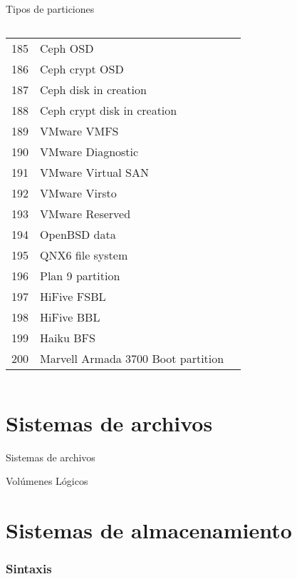 \begin{frame}[c]{Tipos de particiones}
{\begin{columns}
\begin{table}[]
\begin{tabular}{rll}
185&Ceph OSD                      \\
186&Ceph crypt OSD                \\
187&Ceph disk in creation         \\
188&Ceph crypt disk in creation    \\
189&VMware VMFS                    \\
190&VMware Diagnostic              \\
191&VMware Virtual SAN             \\
192&VMware Virsto                  \\
193&VMware Reserved                \\
194&OpenBSD data                   \\
195&QNX6 file system               \\
196&Plan 9 partition               \\
197&HiFive FSBL                    \\
198&HiFive BBL                     \\
199&Haiku BFS                      \\
200&Marvell Armada 3700 Boot partition \\
  \end{tabular}
  \end{table}
  \end{columns}
}
\end{frame}

\section{Sistemas de archivos}

\begin{frame}[c]{Sistemas de archivos}
\end{frame}

\begin{frame}[c]{Volúmenes Lógicos}

\end{frame}

\section{Sistemas de almacenamiento}

\begin{frame}[fragile]
  \frametitle{Sintaxis}

  \vspace{\baselineskip}
\end{frame}
